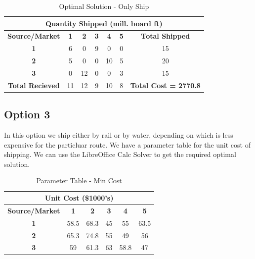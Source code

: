 \documentclass[12pt]{article}
\numberwithin{equation}{section}
\numberwithin{table}{section}
\numberwithin{figure}{section}
\begin{document}
\begin{table}[h!]
\centering
\caption{Optimal Solution - Only Ship}
\label{optimal_ship}
\begin{tabular}{|c|c|c|c|c|c|c}
\hline
\multicolumn{7}{|c|}{\textbf{Quantity Shipped (mill. board ft)}}                                                                       \\ \hline
\textbf{Source/Market}  & \textbf{1} & \textbf{2} & \textbf{3} & \textbf{4} & \textbf{5} & \multicolumn{1}{c|}{\textbf{Total Shipped}} \\ \hline
\textbf{1}              & 6          & 0          & 9          & 0          & 0          & \multicolumn{1}{c|}{15}                     \\ \hline
\textbf{2}              & 5          & 0          & 0          & 10         & 5          & \multicolumn{1}{c|}{20}                     \\ \hline
\textbf{3}              & 0          & 12         & 0          & 0          & 3          & \multicolumn{1}{c|}{15}                     \\ \hline
\textbf{Total Recieved} & 11         & 12         & 9          & 10         & 8          & \textbf{Total Cost = 2770.8}                \\ \cline{1-6}
\end{tabular}
\end{table}



\subsection{Option 3}
In this option we ship either by rail or by water, depending on which is less expensive for the particluar route. We have a parameter table for the unit cost of shipping. We can use the LibreOffice Calc Solver to get the required optimal solution.

\begin{table}[h!]
\centering
\caption{Parameter Table - Min Cost}
\label{param_min}
\begin{tabular}{|c|c|c|c|c|c|}
\hline
\multicolumn{6}{|c|}{\textbf{Unit Cost (\$1000's)}}                                     \\ \hline
\textbf{Source/Market} & \textbf{1} & \textbf{2} & \textbf{3} & \textbf{4} & \textbf{5} \\ \hline
\textbf{1}             & 58.5       & 68.3       & 45         & 55         & 63.5       \\ \hline
\textbf{2}             & 65.3       & 74.8       & 55         & 49         & 56         \\ \hline
\textbf{3}             & 59         & 61.3       & 63         & 58.8       & 47         \\ \hline
\end{tabular}
\end{table}
\end{document}
